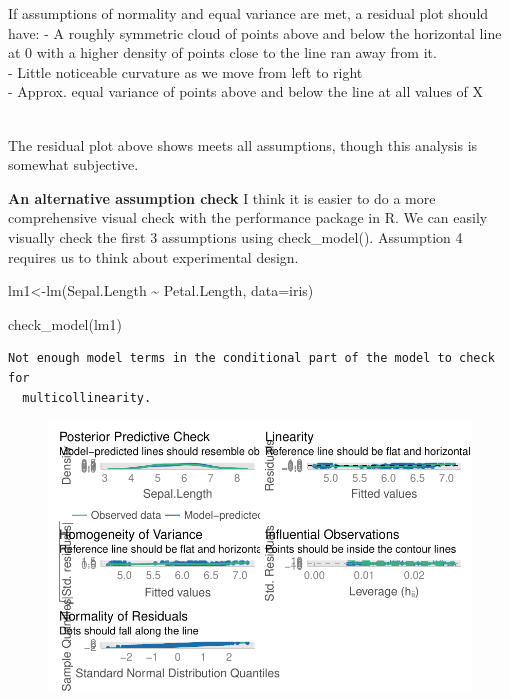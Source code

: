\documentclass[
  letterpaper,
  DIV=11,
  numbers=noendperiod]{scrartcl}
\newenvironment{Shaded}{\begin{snugshade}}{\end{snugshade}}
\newcommand{\AttributeTok}[1]{\textcolor[rgb]{0.40,0.45,0.13}{#1}}
\newcommand{\FunctionTok}[1]{\textcolor[rgb]{0.28,0.35,0.67}{#1}}
\newcommand{\NormalTok}[1]{\textcolor[rgb]{0.00,0.23,0.31}{#1}}
\newcommand{\OtherTok}[1]{\textcolor[rgb]{0.00,0.23,0.31}{#1}}
\newcommand{\SpecialCharTok}[1]{\textcolor[rgb]{0.37,0.37,0.37}{#1}}
\begin{document}
\hfill\break
If assumptions of normality and equal variance are met, a residual plot
should have: - A roughly symmetric cloud of points above and below the
horizontal line at 0 with a higher density of points close to the line
ran away from it.\\
- Little noticeable curvature as we move from left to right\\
- Approx. equal variance of points above and below the line at all
values of X\\
\strut \\

The residual plot above shows meets all assumptions, though this
analysis is somewhat subjective.

\textbf{An alternative assumption check} I think it is easier to do a
more comprehensive visual check with the performance package in R. We
can easily visually check the first 3 assumptions using check\_model().
Assumption 4 requires us to think about experimental design.

\begin{Shaded}
\begin{Highlighting}[]
\NormalTok{lm1}\OtherTok{\textless{}{-}}\FunctionTok{lm}\NormalTok{(Sepal.Length }\SpecialCharTok{\textasciitilde{}}\NormalTok{ Petal.Length, }\AttributeTok{data=}\NormalTok{iris)}

\FunctionTok{check\_model}\NormalTok{(lm1)}
\end{Highlighting}
\end{Shaded}

\begin{verbatim}
Not enough model terms in the conditional part of the model to check for
  multicollinearity.
\end{verbatim}

\begin{figure}[H]

{\centering \includegraphics{cor_reg_chi_files/figure-pdf/unnamed-chunk-14-1.pdf}

}

\end{figure}
\end{document}
